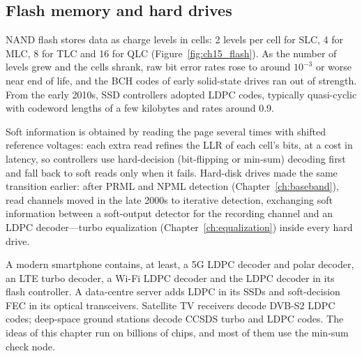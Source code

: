 \subsection{Flash memory and hard drives}

NAND flash stores data as charge levels in cells: 2 levels per cell for SLC, 4 for MLC, 8 for TLC and
16 for QLC (Figure~\ref{fig:ch15_flash}). As the number of levels grew and the cells shrank, raw bit
error rates rose to around $10^{-3}$ or worse near end of life, and the BCH codes of early solid-state
drives ran out of strength. From the early 2010s, SSD controllers adopted LDPC codes, typically
quasi-cyclic with codeword lengths of a few kilobytes and rates around 0.9.

Soft information is obtained by reading the page several times with shifted reference voltages:
each extra read refines the LLR of each cell's bits, at a cost in latency, so controllers use
hard-decision (bit-flipping or min-sum) decoding first and fall back to soft reads only when it
fails. Hard-disk drives made the same transition earlier: after PRML and NPML detection
(Chapter~\ref{ch:baseband}), read channels moved in the late 2000s to iterative detection, exchanging
soft information between a soft-output detector for the recording channel and an LDPC
decoder---turbo equalization (Chapter~\ref{ch:equalization}) inside every hard drive.


\begin{inpractice}
A modern smartphone contains, at least, a 5G LDPC decoder and polar decoder, an LTE turbo decoder, a
Wi-Fi LDPC decoder and the LDPC decoder in its flash controller. A data-centre server adds LDPC in its
SSDs and soft-decision FEC in its optical transceivers. Satellite TV receivers decode DVB-S2 LDPC
codes; deep-space ground stations decode CCSDS turbo and LDPC codes. The ideas of this chapter run
on billions of chips, and most of them use the min-sum check node.
\end{inpractice}


